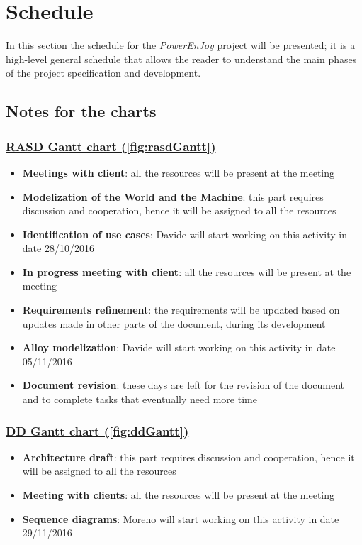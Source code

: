 \section{Schedule}\label{sec:schedule}
In this section the schedule for the \emph{PowerEnJoy} project will be presented; it is a high-level general schedule that allows the reader to understand the main phases of the project specification and development.

\subsection{Notes for the charts}
\subsubsection{\hyperref[fig:rasdGantt]{RASD Gantt chart (\autoref{fig:rasdGantt})}}
\begin{itemize}
	\item \textbf{Meetings with client}: all the resources will be present at the meeting
	\item \textbf{Modelization of the World and the Machine}: this part requires discussion and cooperation, hence it will be assigned to all the resources
	\item \textbf{Identification of use cases}: Davide will start working on this activity in date 28/10/2016
	\item \textbf{In progress meeting with client}: all the resources will be present at the meeting
	\item \textbf{Requirements refinement}: the requirements will be updated based on updates made in other parts of the document, during its development
	\item \textbf{Alloy modelization}: Davide will start working on this activity in date 05/11/2016
	\item \textbf{Document revision}: these days are left for the revision of the document and to complete tasks that eventually need more time
\end{itemize}

\subsubsection{\hyperref[fig:ddGantt]{DD Gantt chart (\autoref{fig:ddGantt})}}
\begin{itemize}
	\item \textbf{Architecture draft}: this part requires discussion and cooperation, hence it will be assigned to all the resources
	\item \textbf{Meeting with clients}: all the resources will be present at the meeting
	\item \textbf{Sequence diagrams}: Moreno will start working on this activity in date 29/11/2016
\end{itemize}

